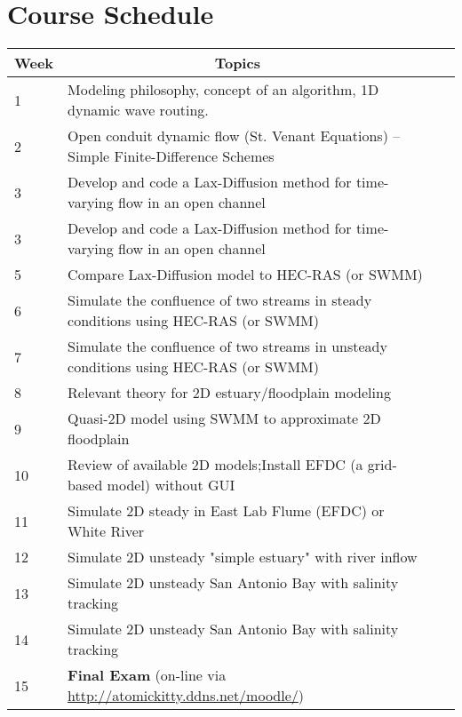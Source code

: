 \documentclass[12pt]{article}
\begin{document}
\section*{\small{Course Schedule}}
\begin{tabular}{p{0.25in}p{5.8in}p{0.2in}}
Week & {~~~~~~~~~~~~~~~~~~Topics} & ~ \\
\hline
\hline
1 &  Modeling philosophy, concept of an algorithm, 1D dynamic wave routing. & ~ \\
2 &  Open conduit dynamic flow (St. Venant Equations) -- Simple Finite-Difference Schemes & ~\\
3 &  Develop and code a Lax-Diffusion method for time-varying flow in an open channel& ~ \\
3 &  Develop and code a Lax-Diffusion method for time-varying flow in an open channel& ~ \\
5 &  Compare Lax-Diffusion model to HEC-RAS (or SWMM) & ~ \\
6 &  Simulate the confluence of two streams in steady conditions using HEC-RAS (or SWMM) & ~ \\
7 &  Simulate the confluence of two streams in unsteady conditions using HEC-RAS (or SWMM) & ~ \\
8 & Relevant theory for 2D estuary/floodplain modeling& ~\\
9 & Quasi-2D model using SWMM to approximate 2D floodplain  & ~\\
10 & Review of available 2D models;Install EFDC (a grid-based model) without GUI  & \\
11 & Simulate 2D steady in East Lab Flume (EFDC) or White River & \\
12 & Simulate 2D unsteady "simple estuary" with river inflow  & ~\\
13 & Simulate 2D  unsteady San Antonio Bay with salinity tracking & \\
14 & Simulate 2D  unsteady San Antonio Bay with salinity tracking & ~\\
15 & \textbf{Final Exam} (on-line via \url{http://atomickitty.ddns.net/moodle/})& \\

\end{tabular}
\end{document}
